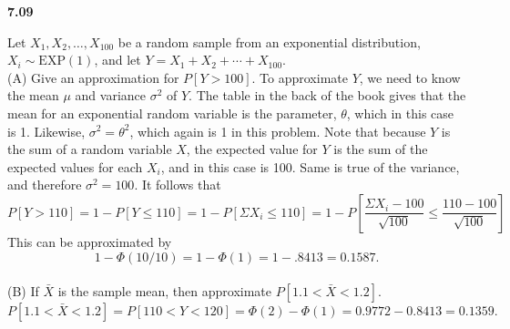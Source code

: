{\bf 7.09}

Let $X_1, X_2, \ldots, X_{100}$ be a random sample from an exponential distribution, $X_i \sim \text{EXP}(1)$, and let $Y = X_1 + X_2 + \cdots + X_{100}$.\\
(A)	Give an approximation for $P[Y > 100]$.
To approximate $Y$, we need to know the mean $\mu$ and variance $\sigma^2$ of $Y$. The table in the back of the book gives that the mean for an exponential random variable is the parameter, $\theta$, which in this case is 1. Likewise, $\sigma^2 = \theta^2$, which again is 1 in this problem. Note that because $Y$ is the sum of a random variable $X$, the expected value for $Y$ is the sum of the expected values for each $X_i$, and in this case is 100. Same is true of the variance, and therefore $\sigma^2 = 100$. It follows that 
$$P[Y > 110] = 1 - P[Y \leq 110] = 1 - P[\Sigma X_i \leq 110] = 1 - P[\frac{\Sigma X_i - 100}{\sqrt{100}} \leq \frac{110 - 100}{\sqrt{100}}]$$
This can be approximated by $$1 - \Phi (10/10) = 1 - \Phi(1) = 1 - .8413 = 0.1587.$$\\
(B) If $\bar{X}$ is the sample mean, then approximate $P[1.1<\bar{X}<1.2]$.
$P[1.1<\bar{X}<1.2]=P[110<Y<120]=\Phi(2)-\Phi(1)=0.9772-0.8413=0.1359.$\\